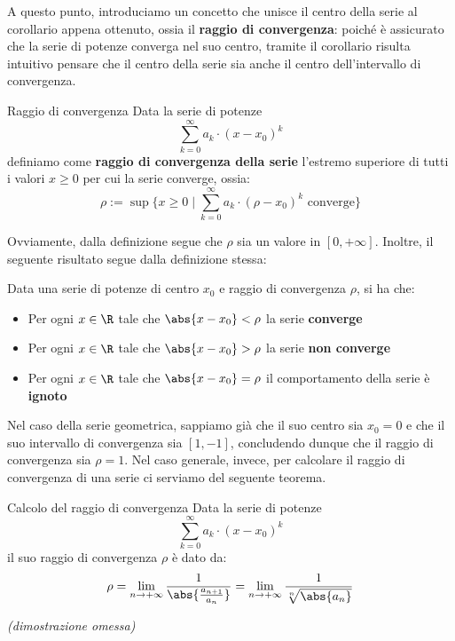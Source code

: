 \documentclass[a4paper, 12pt]{report}
\begin{document}
    A questo punto, introduciamo un concetto che unisce il centro della serie al corollario appena ottenuto, ossia il \textbf{raggio di convergenza}: poiché è assicurato che la serie di potenze converga nel suo centro, tramite il corollario risulta intuitivo pensare che il centro della serie sia anche il centro dell'intervallo di convergenza.

    \begin{frameddefn}{Raggio di convergenza}
        Data la serie di potenze
        \[\sum_{k = 0}^{\infty} a_k \cdot (x-x_0)^k\]
        definiamo come \textbf{raggio di convergenza della serie} l'estremo superiore di tutti i valori $x \geq 0$ per cui la serie converge, ossia:
        \[\rho := \sup \{x \geq 0 \mid \sum_{k = 0}^{\infty} a_k \cdot (\rho-x_0)^k \text{ converge}\}\]
    \end{frameddefn}

    Ovviamente, dalla definizione segue che $\rho$ sia un valore in $[0, +\infty]$. Inoltre, il seguente risultato segue dalla definizione stessa:

    \begin{framedprop}{}
        Data una serie di potenze di centro $x_0$ e raggio di convergenza $\rho$, si ha che:
        \begin{itemize}
            \item Per ogni $x \in \R$ tale che $\abs{x-x_0} < \rho$ la serie \textbf{converge}
            \item Per ogni $x \in \R$ tale che $\abs{x-x_0} > \rho$ la serie \textbf{non converge}
            \item Per ogni $x \in \R$ tale che $\abs{x-x_0} = \rho$ il comportamento della serie è \textbf{ignoto}
        \end{itemize} 
    \end{framedprop}

    Nel caso della serie geometrica, sappiamo già che il suo centro sia $x_0 = 0$ e che il suo intervallo di convergenza sia $[1, -1]$, concludendo dunque che il raggio di convergenza sia $\rho = 1$. Nel caso generale, invece, per calcolare il raggio di convergenza di una serie ci serviamo del seguente teorema.

    \begin{framedthm}{Calcolo del raggio di convergenza}
        Data la serie di potenze
        \[\sum_{k = 0}^{\infty} a_k \cdot (x-x_0)^k\]
        il suo raggio di convergenza $\rho$ è dato da:
        $$
        \rho =  \lim_{n \to +\infty} \frac{1}{\abs{\frac{a_{n+1}}{a_n}}} = \lim_{n \to +\infty} \frac{1}{\sqrt[n]{\abs{a_n}}}
        $$

        \textit{(dimostrazione omessa)}
    \end{framedthm}
\end{document}
